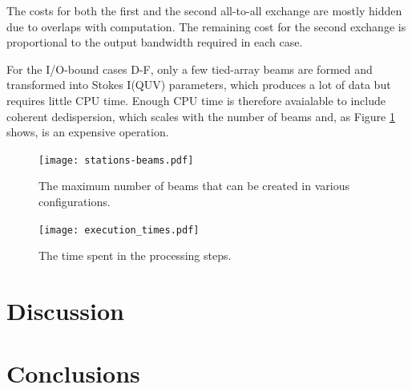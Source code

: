 \documentclass{llncs}
\begin{document}
The costs for both the first and the second all-to-all exchange are mostly hidden due to overlaps with computation. The remaining cost for the second exchange is proportional to the output bandwidth required in each case.

For the I/O-bound cases D-F, only a few tied-array beams are formed and transformed into Stokes I(QUV) parameters, which produces a lot of data but requires little CPU time. Enough CPU time is therefore avaialable to include coherent dedispersion, which scales with the number of beams and, as Figure \ref{fig:execution-times} shows, is an expensive operation.



\begin{figure}[ht]
\begin{minipage}[t]{0.47\textwidth}
\texttt{[image: stations-beams.pdf]}
\label{fig:stations-beams}
\caption{The maximum number of beams that can be created in various configurations.}
\end{minipage}
\hfill
\begin{minipage}[t]{0.47\textwidth}
\texttt{[image: execution\_times.pdf]}
\label{fig:execution-times}
\caption{The time spent in the processing steps.}
\end{minipage}
\end{figure}


\cite{Hessels:09}

\section{Discussion}


\section{Conclusions}




\end{document}
